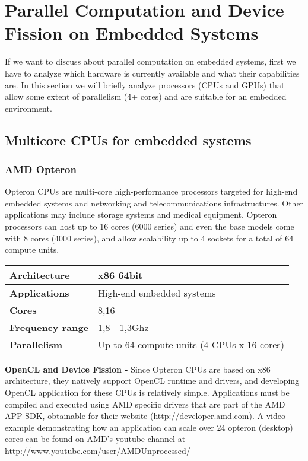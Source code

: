 \section{Parallel Computation and Device Fission on Embedded Systems}

If we want to discuss about parallel computation on embedded systems, first we have to analyze which hardware is currently available and what their capabilities are.
In this section we will briefly analyze processors (CPUs and GPUs) that allow some extent of parallelism (4+ cores) and are suitable for an embedded environment.

\subsection{Multicore CPUs for embedded systems}

\subsubsection* {AMD Opteron}
Opteron CPUs are multi-core high-performance processors targeted for high-end embedded systems and networking and telecommunications infrastructures. Other applications may include storage systems and medical equipment.
Opteron processors can host up to 16 cores (6000 series) and even the base models come with 8 cores (4000 series), and allow scalability up to 4 sockets for a total of 64 compute units.\cite{amd:opteron6000}\\

\begin{tablehere}
{\footnotesize
\begin{tabular}{|p{3cm}|p{3cm}|}\hline
\textbf{Architecture}& x86 64bit\\ \hline
\textbf{Applications}& High-end embedded systems\\ \hline
\textbf{Cores}& 8,16\\ \hline
\textbf{Frequency range}& 1,8 - 1,3Ghz\\ \hline
\textbf{Parallelism}& Up to 64 compute units (4 CPUs x 16 cores)\\ \hline
\end{tabular}}
\label{tab:OpteronCPU}
\end{tablehere}
 
\textbf{OpenCL and Device Fission - } Since Opteron CPUs are based on x86 architecture, they natively support OpenCL runtime and drivers, and developing OpenCL application for these CPUs is relatively simple. Applications must be compiled and executed using AMD specific drivers that are part of the AMD APP SDK, obtainable for their website (http://developer.amd.com). A video example demonstrating how an application can scale over 24 opteron (desktop) cores can be found on AMD's youtube channel at http://www.youtube.com/user/AMDUnprocessed/

